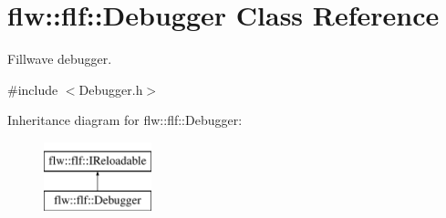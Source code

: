 \hypertarget{classflw_1_1flf_1_1Debugger}{}\section{flw\+:\+:flf\+:\+:Debugger Class Reference}
\label{classflw_1_1flf_1_1Debugger}


Fillwave debugger.  




{\ttfamily \#include $<$Debugger.\+h$>$}

Inheritance diagram for flw\+:\+:flf\+:\+:Debugger\+:\begin{figure}[H]
\begin{center}
\leavevmode
\includegraphics[height=2.000000cm]{classflw_1_1flf_1_1Debugger}
\end{center}
\end{figure}
